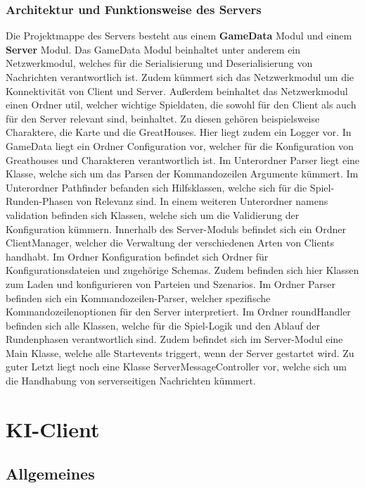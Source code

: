 \documentclass[12pt]{article}
\begin{document}
\subsubsection{Architektur und Funktionsweise des Servers}
Die Projektmappe des Servers besteht aus einem \textbf{GameData} Modul und einem \textbf{Server} Modul. Das GameData Modul beinhaltet unter anderem ein Netzwerkmodul, welches für die Serialisierung und Deserialisierung von Nachrichten verantwortlich ist. Zudem kümmert sich das Netzwerkmodul um die Konnektivität von Client und Server. Außerdem beinhaltet das Netzwerkmodul einen Ordner util, welcher wichtige Spieldaten, die sowohl für den Client als auch für den Server relevant sind, beinhaltet. Zu diesen gehören beispielsweise Charaktere, die Karte und die GreatHouses. Hier liegt zudem ein Logger vor. In GameData liegt ein Ordner Configuration vor, welcher für die Konfiguration von Greathouses und Charakteren verantwortlich ist. Im Unterordner Parser liegt eine Klasse, welche sich um das Parsen der Kommandozeilen Argumente kümmert. Im Unterordner Pathfinder befanden sich Hilfsklassen, welche sich für die Spiel-Runden-Phasen von Relevanz sind. In einem weiteren Unterordner namens validation befinden sich Klassen, welche sich um die Validierung der Konfiguration kümmern. Innerhalb des Server-Moduls befindet sich ein Ordner ClientManager, welcher die Verwaltung der verschiedenen Arten von Clients handhabt. Im Ordner Konfiguration befindet sich Ordner für Konfigurationsdateien und zugehörige Schemas. Zudem befinden sich hier Klassen zum Laden und konfigurieren von Parteien und Szenarios. Im Ordner Parser befinden sich ein Kommandozeilen-Parser, welcher spezifische Kommandozeilenoptionen für den Server interpretiert. Im Ordner roundHandler befinden sich alle Klassen, welche für die Spiel-Logik und den Ablauf der Rundenphasen verantwortlich sind. Zudem befindet sich im Server-Modul eine Main Klasse, welche alle Startevents triggert, wenn der Server gestartet wird. Zu guter Letzt liegt noch eine Klasse ServerMessageController vor, welche sich um die Handhabung von serverseitigen Nachrichten kümmert.


\section{KI-Client}

\subsection{Allgemeines}
\end{document}
